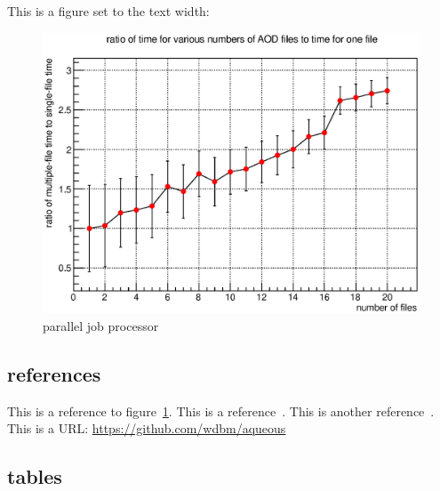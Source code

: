 This is a figure set to the text width:

\begin{figure}[H]
\begin{center}
\includegraphics[width=\textwidth]{images/2014-04-10_2.eps}
\end{center}
\caption{parallel job processor}
\label{figure:PJP_1}
\end{figure}

\subsection{references}

This is a reference to figure~\ref{figure:PJP_1}. This is a reference~\cite{Tianjun_1}. This is another reference~\cite{McCulloch_Pitts_1}. This is a URL: \href{https://github.com/wdbm/aqueous}{\textcolor{black!100}{https://github.com/wdbm/aqueous}}


\subsection{tables}

